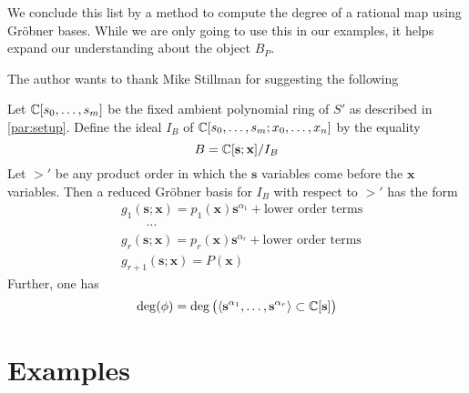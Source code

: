 \documentclass[fleqn,reqno]{amsart}
\begin{document}
\begin{paragraf*}
We conclude this list by a method to compute the degree of a rational map using Gr\"{o}bner bases.
While we are only going to use this in our examples,
it helps expand our understanding about the object $B_P$.

The author wants to thank Mike Stillman for suggesting the following
\end{paragraf*}

\begin{proposition}
\label{prop:deg-GB}
Let $\mathbb{C}[s_0,\ldots,s_m]$ be the fixed ambient polynomial ring of $S'$ as described in
\eqref{par:setup}.
Define the ideal $I_B$ of $\mathbb{C}[s_0,\ldots,s_m;x_0,\ldots,x_n]$ by the equality
\[
	B=\mathbb{C}[\mathbf s;\mathbf x]/I_B
\]
Let $>'$ be any product order in which the $\mathbf s$ variables
come before the $\mathbf x$ variables.
Then a reduced Gr\"obner basis for $I_B$ with respect to $>'$ has the form
\begin{align*}
	&g_1(\mathbf s;\mathbf x)=p_1(\mathbf x){\mathbf s}^{\alpha_1}+\text{lower order terms}\\
	&\qquad\cdots\\
	&g_r(\mathbf s;\mathbf x)=p_r(\mathbf x){\mathbf s}^{\alpha_r}+\text{lower order terms}\\
	&g_{r+1}(\mathbf s;\mathbf x)=P(\mathbf x)
\end{align*}
Further, one has
\[
	\deg(\phi)=
	\deg \big(\langle{\mathbf s}^{\alpha_1},\ldots,{\mathbf s}^{\alpha_r}\rangle\subset\mathbb{C}[\mathbf s]\big)
\]
\end{proposition}





\section{Examples}
\label{sec:examples}
\end{document}
